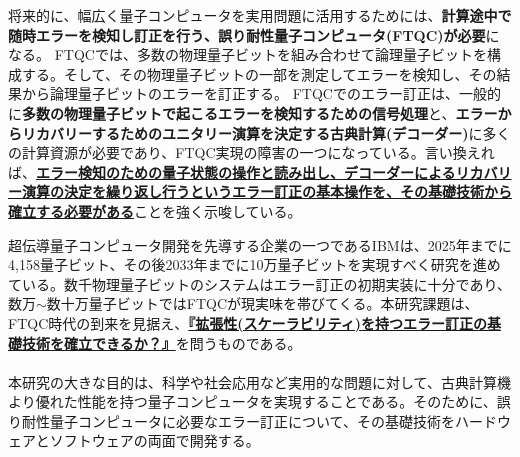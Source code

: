 \documentclass[11pt,a4j,dvipdfmx]{jarticle} 					%
\newcommand{\研究課題名}{誤り耐性量子コンピュータに向けた誤り訂正技術の開発(仮)}
\newcommand{\研究機関名}{東京大学}
\newcommand{\研究代表者氏名}{寺師弘二}
\newcommand{\研究期間の最終元号年度}{10}  %
\newcommand{\mybf}[1]{{\bfseries\sffamily#1}}
\begin{document}
将来的に、幅広く量子コンピュータを実用問題に活用するためには、\mybf{計算途中で随時エラーを検知し訂正を行う、誤り耐性量子コンピュータ(FTQC)が必要}になる。
FTQCでは、多数の物理量子ビットを組み合わせて論理量子ビットを構成する。そして、その物理量子ビットの一部を測定してエラーを検知し、その結果から論理量子ビットのエラーを訂正する。
FTQCでのエラー訂正は、一般的に\mybf{多数の物理量子ビットで起こるエラーを検知するための信号処理}と、\mybf{エラーからリカバリーするためのユニタリー演算を決定する古典計算(デコーダー)}に多くの計算資源が必要であり、FTQC実現の障害の一つになっている。言い換えれば、\mybf{\ul{エラー検知のための量子状態の操作と読み出し、デコーダーによるリカバリー演算の決定を繰り返し行うというエラー訂正の基本操作を、その基礎技術から確立する必要がある}}ことを強く示唆している。

超伝導量子コンピュータ開発を先導する企業の一つであるIBMは、2025年までに4,158量子ビット、その後2033年までに10万量子ビットを実現すべく研究を進めている。数千物理量子ビットのシステムはエラー訂正の初期実装に十分であり、数万$\sim$数十万量子ビットではFTQCが現実味を帯びてくる。本研究課題は、FTQC時代の到来を見据え、\mybf{\ul{『拡張性(スケーラビリティ)を持つエラー訂正の基礎技術を確立できるか？』}}を問うものである。\\

\\
本研究の大きな目的は、科学や社会応用など実用的な問題に対して、古典計算機より優れた性能を持つ量子コンピュータを実現することである。そのために、誤り耐性量子コンピュータに必要なエラー訂正について、その基礎技術をハードウェアとソフトウェアの両面で開発する。 \\
\end{document}
